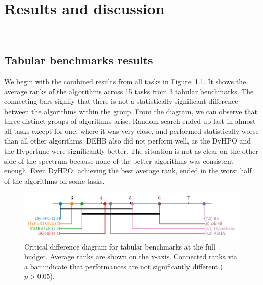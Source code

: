 \newlength{\plotheight}
\setlength{\plotheight}{5.8cm}

\chapter{Results and discussion}\

\section{Tabular benchmarks results}

We begin with the combined results from all tasks in Figure~\ref{ci:tabular}. It shows the average ranks of the algorithms across 15 tasks from 3 tabular benchmarks. The connecting bars signify that there is not a statistically significant difference between the algorithms within the group. From the diagram, we can observe that three distinct groups of algorithms arise. Random search ended up last in almost all tasks except for one, where it was very close, and performed statistically worse than all other algorithms. DEHB also did not perform well, as the DyHPO and the Hypertune were significantly better. The situation is not as clear on the other side of the spectrum because none of the better algorithms was consistent enough. Even DyHPO, achieving the best average rank, ended in the worst half of the algorithms on some tasks.

\begin{figure}[H]
    \centering
    \includegraphics[scale=.75]{./img/tabular_exp/cd_diagram.pdf}
    \caption{Critical difference diagram for tabular benchmarks at the full budget. Average ranks are shown on the x-axis. Connected ranks via a bar indicate that performances are not significantly different ($p>0.05$).}
    \label{ci:tabular}
\end{figure}

